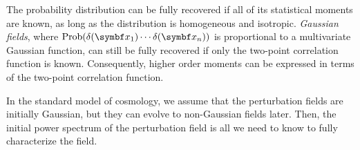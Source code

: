 The probability distribution can be fully recovered if all of its statistical moments are known, as long as the distribution is homogeneous and isotropic. \emph{Gaussian fields}, where $\Prob(\delta(\vec{x}_1) \cdots \delta(\vec{x}_n))$ is proportional to a multivariate Gaussian function, can still be fully recovered if only the two-point correlation function is known. Consequently, higher order moments can be expressed in terms of the two-point correlation function.

In the standard model of cosmology, we assume that the perturbation fields are initially Gaussian, but they can evolve to non-Gaussian fields later. Then, the initial power spectrum of the perturbation field is all we need to know to fully characterize the field.














